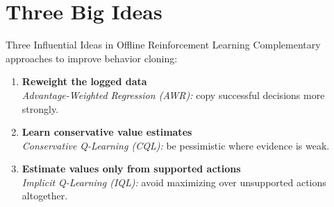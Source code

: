 \section{Three Big Ideas}

\begin{frame}{Three Influential Ideas in Offline Reinforcement Learning}
  Complementary approaches to improve behavior cloning:

  \vspace{0.35cm}
  \begin{enumerate}
    \item \textbf{Reweight the logged data} \\
    \emph{Advantage-Weighted Regression (AWR):} copy successful decisions more strongly.

    \vspace{0.25cm}
    \item \textbf{Learn conservative value estimates} \\
    \emph{Conservative Q-Learning (CQL):} be pessimistic where evidence is weak.

    \vspace{0.25cm}
    \item \textbf{Estimate values only from supported actions} \\
    \emph{Implicit Q-Learning (IQL):} avoid maximizing over unsupported actions altogether.
  \end{enumerate}

\end{frame}

